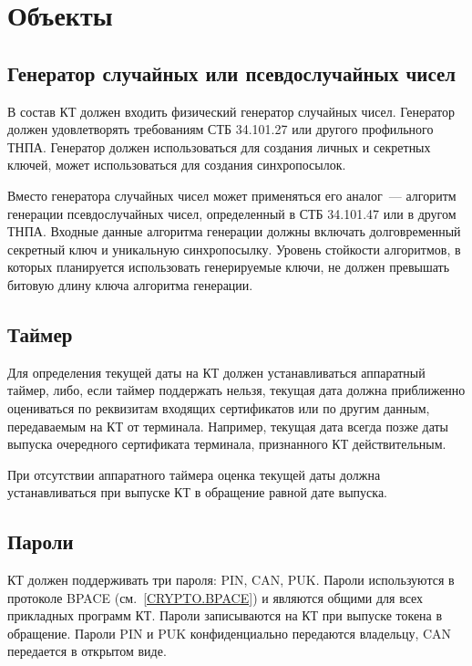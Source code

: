 \chapter{Объекты}\label{OBJ}

\section{Генератор случайных или псевдослучайных чисел}\label{OBJ.RNG}

В состав КТ должен входить физический генератор случайных чисел.
Генератор должен удовлетворять требованиям СТБ 34.101.27 или другого 
профильного ТНПА. Генератор должен использоваться для создания личных и 
секретных ключей, может использоваться для создания синхропосылок. 

Вместо генератора случайных чисел может применяться его аналог~--- алгоритм 
генерации псевдослучайных чисел, определенный в СТБ 34.101.47 или в другом 
ТНПА. Входные данные алгоритма генерации должны включать долговременный 
секретный ключ и уникальную синхропосылку.
%
Уровень стойкости алгоритмов, в которых планируется использовать 
генерируемые ключи, не должен превышать битовую длину ключа алгоритма генерации.

\section{Таймер}\label{OBJ.Date}

Для определения текущей даты на КТ должен устанавливаться аппаратный таймер, 
либо, если таймер поддержать нельзя, текущая дата должна 
приближенно оцениваться по реквизитам входящих сертификатов или по другим 
данным, передаваемым на КТ от терминала. Например, текущая дата всегда позже 
даты выпуска очередного сертификата терминала, признанного КТ действительным.

При отсутствии аппаратного таймера оценка текущей даты должна устанавливаться 
при выпуске КТ в обращение равной дате выпуска. 

\section{Пароли}\label{OBJ.PWD}

КТ должен поддерживать три пароля: PIN, CAN, PUK.
Пароли используются в протоколе BPACE (см.~\ref{CRYPTO.BPACE})
и являются общими для всех прикладных программ КТ.
%
Пароли записываются на КТ при выпуске токена в обращение. 
Пароли PIN и PUK конфиденциально передаются владельцу, 
CAN передается в открытом виде.

